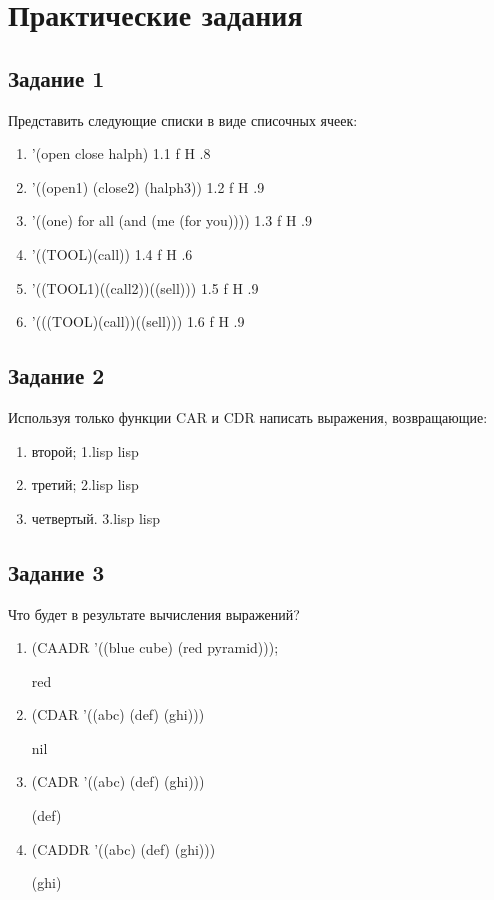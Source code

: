 \chapter{Практические задания}

\section{Задание 1}
Представить следующие списки в виде списочных ячеек:
\begin{enumerate}
	\item '(open close halph)
	{1.1}
	{f}
	{H}
	{.8\textwidth}
	{}
	\item '((open1) (close2) (halph3))
	{1.2}
	{f}
	{H}
	{.9\textwidth}
	{}
	\item '((one) for all (and (me (for you))))
	{1.3}
	{f}
	{H}
	{.9\textwidth}
	{}
	\item '((TOOL)(call))
	{1.4}
	{f}
	{H}
	{.6\textwidth}
	{}
	\item '((TOOL1)((call2))((sell)))
	{1.5}
	{f}
	{H}
	{.9\textwidth}
	{}
	\clearpage
	\item '(((TOOL)(call))((sell)))
	{1.6}
	{f}
	{H}
	{.9\textwidth}
	{}
\end{enumerate}

\section{Задание 2}
Используя только функции CAR и CDR написать выражения, возвращающие:
\begin{enumerate}
	\item второй;
	{1.lisp}
	{lisp}
	{}
	
	\item третий;
	{2.lisp}
	{lisp}
	{}
	
	\item четвертый.
	{3.lisp}
	{lisp}
	{}
\end{enumerate}

\section{Задание 3}
Что будет в результате вычисления выражений?
\begin{enumerate}
	\item (CAADR '((blue cube) (red pyramid)));
	
	red
	\item (CDAR '((abc) (def) (ghi)))
	
	nil
	\item (CADR '((abc) (def) (ghi)))
	
	(def)
	\item (CADDR '((abc) (def) (ghi)))
	
	(ghi)
\end{enumerate}

